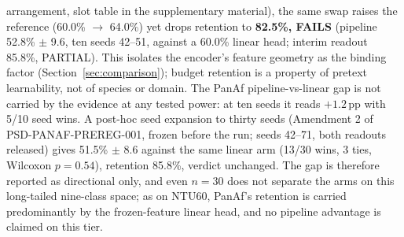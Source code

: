 arrangement, slot table in the supplementary material), the same swap raises the reference (60.0\% $\to$ 64.0\%) yet drops retention to \textbf{82.5\%, FAILS} (pipeline 52.8\% $\pm$ 9.6, ten seeds 42--51, against a 60.0\% linear head; interim readout 85.8\%, PARTIAL). This isolates the encoder's feature geometry as the binding factor (Section~\ref{sec:comparison}); budget retention is a property of pretext learnability, not of species or domain. The PanAf pipeline-vs-linear gap is not carried by the evidence at any tested power: at ten seeds it reads $+1.2$\,pp with 5/10 seed wins. A post-hoc seed expansion to thirty seeds (Amendment 2 of PSD-PANAF-PREREG-001, frozen before the run; seeds 42--71, both readouts released) gives 51.5\% $\pm$ 8.6 against the same linear arm (13/30 wins, 3 ties, Wilcoxon $p=0.54$), retention 85.8\%, verdict unchanged. The gap is therefore reported as directional only, and even $n{=}30$ does not separate the arms on this long-tailed nine-class space; as on NTU60, PanAf's retention is carried predominantly by the frozen-feature linear head, and no pipeline advantage is claimed on this tier.


